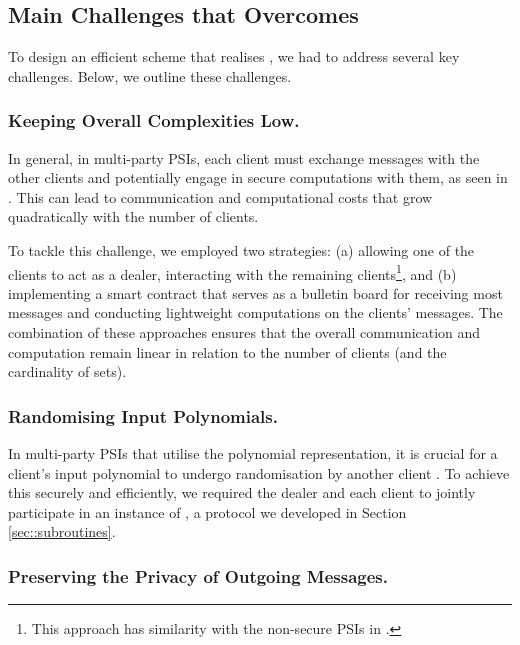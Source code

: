 

\subsection{Main Challenges that \withFai Overcomes}\label{sec::Justitia-challenges}

To design an efficient scheme that realises \p,  we had to address several key challenges. Below, we outline these challenges.



 \subsubsection{Keeping Overall Complexities Low.}
 
 In general, in multi-party PSIs, each client must exchange messages with the other clients and potentially engage in secure computations with them, as seen in \cite{DBLP:conf/scn/InbarOP18,DBLP:conf/ccs/KolesnikovMPRT17}. This can lead to communication and computational costs that grow quadratically with the number of clients.
 
 To tackle this challenge, we employed two strategies: (a) allowing one of the clients to act as a dealer, interacting with the remaining clients\footnote{This approach has similarity with the non-secure PSIs in \cite{GhoshN19}.}, and (b) implementing a smart contract that serves as a bulletin board for receiving most messages and conducting lightweight computations on the clients' messages. The combination of these approaches ensures that the overall communication and computation remain linear in relation to the number of clients (and the cardinality of sets).



 
 
 \subsubsection{Randomising Input Polynomials.}  In multi-party PSIs that utilise the polynomial representation, it is crucial for a client's input polynomial to undergo randomisation by another client \cite{AbadiMZ21}. To achieve this securely and efficiently, we required the dealer and each client to jointly participate in an instance of  \vopr, a protocol we developed in Section \ref{sec::subroutines}. 
 

 
 \subsubsection{Preserving the Privacy of Outgoing Messages.} 
 
